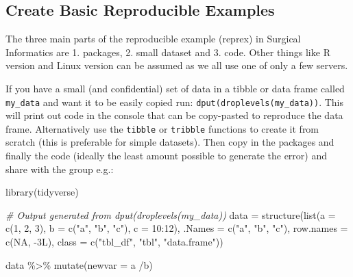 \documentclass[
]{book}
\newenvironment{Shaded}{\begin{snugshade}}{\end{snugshade}}
\newcommand{\AttributeTok}[1]{\textcolor[rgb]{0.77,0.63,0.00}{#1}}
\newcommand{\CommentTok}[1]{\textcolor[rgb]{0.56,0.35,0.01}{\textit{#1}}}
\newcommand{\ConstantTok}[1]{\textcolor[rgb]{0.00,0.00,0.00}{#1}}
\newcommand{\DecValTok}[1]{\textcolor[rgb]{0.00,0.00,0.81}{#1}}
\newcommand{\FunctionTok}[1]{\textcolor[rgb]{0.00,0.00,0.00}{#1}}
\newcommand{\NormalTok}[1]{#1}
\newcommand{\OtherTok}[1]{\textcolor[rgb]{0.56,0.35,0.01}{#1}}
\newcommand{\SpecialCharTok}[1]{\textcolor[rgb]{0.00,0.00,0.00}{#1}}
\newcommand{\StringTok}[1]{\textcolor[rgb]{0.31,0.60,0.02}{#1}}
\begin{document}
\hypertarget{create-basic-reproducible-examples}{%
\subsection{Create Basic Reproducible Examples}\label{create-basic-reproducible-examples}}

The three main parts of the reproducible example (reprex) in Surgical Informatics are 1. packages, 2. small dataset and 3. code. Other things like R version and Linux version can be assumed as we all use one of only a few servers.

If you have a small (and confidential) set of data in a tibble or data frame called \texttt{my\_data} and want it to be easily copied run: \texttt{dput(droplevels(my\_data))}. This will print out code in the console that can be copy-pasted to reproduce the data frame. Alternatively use the \texttt{tibble} or \texttt{tribble} functions to create it from scratch (this is preferable for simple datasets). Then copy in the packages and finally the code (ideally the least amount possible to generate the error) and share with the group e.g.:

\begin{Shaded}
\begin{Highlighting}[]
\FunctionTok{library}\NormalTok{(tidyverse)}

\CommentTok{\# Output generated from dput(droplevels(my\_data))}
\NormalTok{data }\OtherTok{=} \FunctionTok{structure}\NormalTok{(}\FunctionTok{list}\NormalTok{(}\AttributeTok{a =} \FunctionTok{c}\NormalTok{(}\DecValTok{1}\NormalTok{, }\DecValTok{2}\NormalTok{, }\DecValTok{3}\NormalTok{), }\AttributeTok{b =} \FunctionTok{c}\NormalTok{(}\StringTok{"a"}\NormalTok{, }\StringTok{"b"}\NormalTok{, }\StringTok{"c"}\NormalTok{), }\AttributeTok{c =} \DecValTok{10}\SpecialCharTok{:}\DecValTok{12}\NormalTok{), }\AttributeTok{.Names =} \FunctionTok{c}\NormalTok{(}\StringTok{"a"}\NormalTok{, }
\StringTok{"b"}\NormalTok{, }\StringTok{"c"}\NormalTok{), }\AttributeTok{row.names =} \FunctionTok{c}\NormalTok{(}\ConstantTok{NA}\NormalTok{, }\SpecialCharTok{{-}}\NormalTok{3L), }\AttributeTok{class =} \FunctionTok{c}\NormalTok{(}\StringTok{"tbl\_df"}\NormalTok{, }\StringTok{"tbl"}\NormalTok{, }
\StringTok{"data.frame"}\NormalTok{))}

\NormalTok{data }\SpecialCharTok{\%\textgreater{}\%} 
  \FunctionTok{mutate}\NormalTok{(}\AttributeTok{newvar =}\NormalTok{ a }\SpecialCharTok{/}\NormalTok{b)}
\end{Highlighting}
\end{Shaded}
\end{document}
